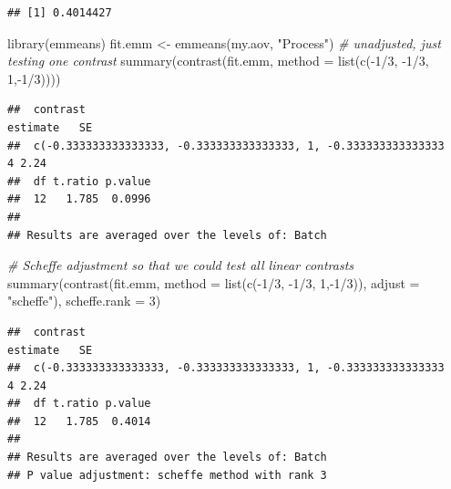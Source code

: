 \documentclass[
]{book}
\newenvironment{Shaded}{\begin{snugshade}}{\end{snugshade}}
\newcommand{\AttributeTok}[1]{\textcolor[rgb]{0.77,0.63,0.00}{#1}}
\newcommand{\CommentTok}[1]{\textcolor[rgb]{0.56,0.35,0.01}{\textit{#1}}}
\newcommand{\DecValTok}[1]{\textcolor[rgb]{0.00,0.00,0.81}{#1}}
\newcommand{\FunctionTok}[1]{\textcolor[rgb]{0.00,0.00,0.00}{#1}}
\newcommand{\NormalTok}[1]{#1}
\newcommand{\OtherTok}[1]{\textcolor[rgb]{0.56,0.35,0.01}{#1}}
\newcommand{\SpecialCharTok}[1]{\textcolor[rgb]{0.00,0.00,0.00}{#1}}
\newcommand{\StringTok}[1]{\textcolor[rgb]{0.31,0.60,0.02}{#1}}
\begin{document}
\begin{verbatim}
## [1] 0.4014427
\end{verbatim}

\begin{Shaded}
\begin{Highlighting}[]
\FunctionTok{library}\NormalTok{(emmeans) }
\NormalTok{fit.emm }\OtherTok{\textless{}{-}} \FunctionTok{emmeans}\NormalTok{(my.aov, }\StringTok{"Process"}\NormalTok{)}
\CommentTok{\# unadjusted, just testing one contrast}
\FunctionTok{summary}\NormalTok{(}\FunctionTok{contrast}\NormalTok{(fit.emm, }\AttributeTok{method =} \FunctionTok{list}\NormalTok{(}\FunctionTok{c}\NormalTok{(}\SpecialCharTok{{-}}\DecValTok{1}\SpecialCharTok{/}\DecValTok{3}\NormalTok{, }\SpecialCharTok{{-}}\DecValTok{1}\SpecialCharTok{/}\DecValTok{3}\NormalTok{, }\DecValTok{1}\NormalTok{,}\SpecialCharTok{{-}}\DecValTok{1}\SpecialCharTok{/}\DecValTok{3}\NormalTok{))))}
\end{Highlighting}
\end{Shaded}

\begin{verbatim}
##  contrast                                                        estimate   SE
##  c(-0.333333333333333, -0.333333333333333, 1, -0.333333333333333        4 2.24
##  df t.ratio p.value
##  12   1.785  0.0996
## 
## Results are averaged over the levels of: Batch
\end{verbatim}

\begin{Shaded}
\begin{Highlighting}[]
\CommentTok{\# Scheffe adjustment so that we could test all linear contrasts}
\FunctionTok{summary}\NormalTok{(}\FunctionTok{contrast}\NormalTok{(fit.emm, }\AttributeTok{method =} \FunctionTok{list}\NormalTok{(}\FunctionTok{c}\NormalTok{(}\SpecialCharTok{{-}}\DecValTok{1}\SpecialCharTok{/}\DecValTok{3}\NormalTok{, }\SpecialCharTok{{-}}\DecValTok{1}\SpecialCharTok{/}\DecValTok{3}\NormalTok{, }\DecValTok{1}\NormalTok{,}\SpecialCharTok{{-}}\DecValTok{1}\SpecialCharTok{/}\DecValTok{3}\NormalTok{)), }
                 \AttributeTok{adjust =} \StringTok{"scheffe"}\NormalTok{), }\AttributeTok{scheffe.rank =} \DecValTok{3}\NormalTok{)}
\end{Highlighting}
\end{Shaded}

\begin{verbatim}
##  contrast                                                        estimate   SE
##  c(-0.333333333333333, -0.333333333333333, 1, -0.333333333333333        4 2.24
##  df t.ratio p.value
##  12   1.785  0.4014
## 
## Results are averaged over the levels of: Batch 
## P value adjustment: scheffe method with rank 3
\end{verbatim}
\end{document}
